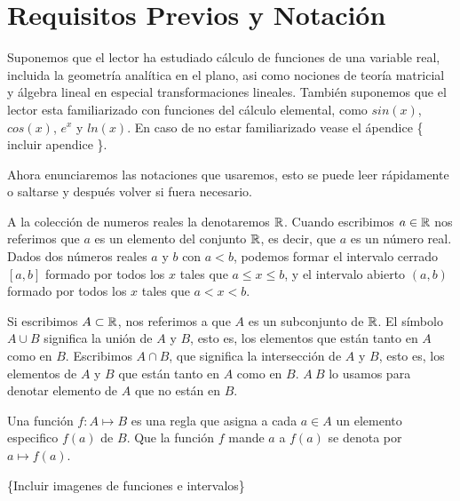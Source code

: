 \section{Requisitos Previos y Notación}

Suponemos que el lector ha estudiado cálculo de funciones de una variable real, incluida la geometría analítica en el plano, asi como nociones de teoría matricial y álgebra lineal en especial transformaciones lineales. También suponemos que el lector esta familiarizado con funciones del cálculo elemental, como $sin(x)$, $cos(x)$, $e^{x}$ y $ln(x)$. En caso de no estar familiarizado vease el ápendice \{ incluir apendice \}.

Ahora enunciaremos las notaciones que usaremos, esto se puede leer rápidamente o saltarse y después volver si fuera necesario.

A la colección de numeros reales la denotaremos $\mathbb{R}$. Cuando escribimos $a \in \mathbb{R}$ nos referimos que $a$ es un elemento del conjunto $\mathbb{R}$, es decir, que $a$ es un número real. Dados dos números reales $a$ y $b$ con $a < b$, podemos formar el intervalo cerrado $[a,b]$ formado por todos los $x$ tales que $a \le x \le b$, y el intervalo abierto $(a,b)$ formado por todos los $x$ tales que $a < x < b$.

Si escribimos $A \subset \mathbb{R}$, nos referimos a que $A$ es un subconjunto de $\mathbb{R}$. El símbolo $A \cup B$ significa la unión de $A$ y $B$, esto es, los elementos que están tanto en $A$ como en $B$. Escribimos $A \cap B$, que significa la intersección de $A$ y $B$, esto es, los elementos de $A$ y $B$ que están tanto en $A$ como en $B$. $A \ B$ lo usamos para denotar elemento de $A$ que no están en $B$.

Una función $f:A \mapsto B$ es una regla que asigna a cada $a \in A$ un elemento especifico $f(a)$ de $B$. Que la función $f$ mande $a$ a $f(a)$ se denota por $a \mapsto f(a)$.

\{Incluir imagenes de funciones e intervalos\} 

